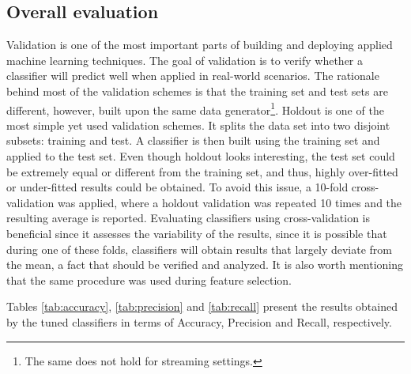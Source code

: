 \documentclass[11pt]{article}
\begin{document}
	\subsection{Overall evaluation}
	
		Validation is one of the most important parts of building and deploying applied machine learning techniques.
		The goal of validation is to verify whether a classifier will predict well when applied in real-world scenarios.
		The rationale behind most of the validation schemes is that the training set and test sets are different, however, built upon the same data generator\footnote{The same does not hold for streaming settings.}.
		Holdout is one of the most simple yet used validation schemes.
		It splits the data set into two disjoint subsets: training and test.
		A classifier is then built using the training set and applied to the test set.
		Even though holdout looks interesting, the test set could be extremely equal or different from the training set, and thus, highly over-fitted or under-fitted results could be obtained.
		To avoid this issue, a 10-fold cross-validation was applied, where a holdout validation was repeated 10 times and the resulting average  is reported.
		Evaluating classifiers using cross-validation is beneficial since it assesses the variability of the results, since it is possible that during one of these folds, classifiers will obtain results that largely deviate from the mean, a fact that should be verified and analyzed.
		It is also worth mentioning that the same procedure was used during feature selection.
						
		Tables \ref{tab:accuracy}, \ref{tab:precision} and \ref{tab:recall} present the results obtained by the tuned classifiers in terms of Accuracy, Precision and Recall, respectively.


		\begin{table*}[!t]
			\centering
			\caption{Average accuracy (\%) obtained in the test script.}
			\label{tab:accuracy}
		\end{table*}
	
\end{document}
